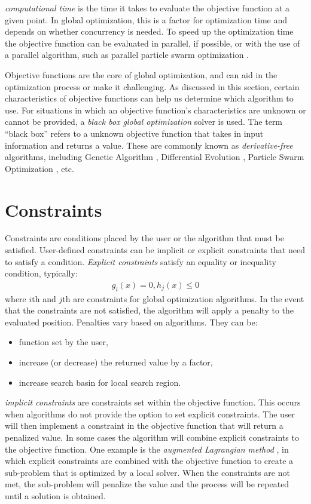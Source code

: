 \textit{computational time} is the time it takes to evaluate the objective function at a given point. In global optimization, this is a factor for optimization time and depends on whether concurrency is needed. To speed up the optimization time the objective function can be evaluated in parallel, if possible, or with the use of a parallel algorithm, such as parallel particle swarm optimization \cite{Hung2012}. 

Objective functions are the core of global optimization, and can aid in the optimization process or make it challenging. As discussed in this section, certain characteristics of objective functions can help us determine which algorithm to use. For situations in which an objective function's characteristics are unknown or cannot be provided, a \textit{black box global
optimization} solver is used. The term ``black box'' refers to a unknown objective function that takes in input information and returns a value. These are commonly known as \textit{derivative-free} algorithms, including Genetic Algorithm \cite{Aguiar}, Differential Evolution \cite{Aguiar}, Particle Swarm Optimization \cite{Kennedy1995}, etc.


\section{Constraints}
Constraints are conditions placed by the user or the algorithm that must be satisfied. User-defined constraints can be implicit or explicit constraints that need to satisfy a condition. \textit{Explicit constraints} satisfy an equality or inequality condition, typically:
\begin{align}
    \label{eq:constraints}
    g_i(x) = 0, 
    h_j(x) \leq 0 
\end{align}
where $i$th and $j$th are constraints for global optimization algorithms. In the event that the constraints are not satisfied, the algorithm will apply a penalty to the evaluated position. Penalties vary based on algorithms. They can be:
\begin{itemize}
    \item function set by the user,
    \item increase (or decrease) the returned value by a factor, 
    \item increase search basin for local search region.
\end{itemize}

\textit{implicit constraints} are constraints set within the objective function. This occurs when algorithms do not provide the option to set explicit constraints. The user will then implement a constraint in the objective function that will return a penalized value. In some cases the algorithm will combine explicit constraints to the objective function. One example is the \textit{augmented Lagrangian method} \cite{Mathematics2008}, in which explicit constraints are combined with the objective function to create a sub-problem that is optimized by a local solver. When the constraints are not met, the sub-problem will penalize the value and the process will be repeated until a solution is obtained.

